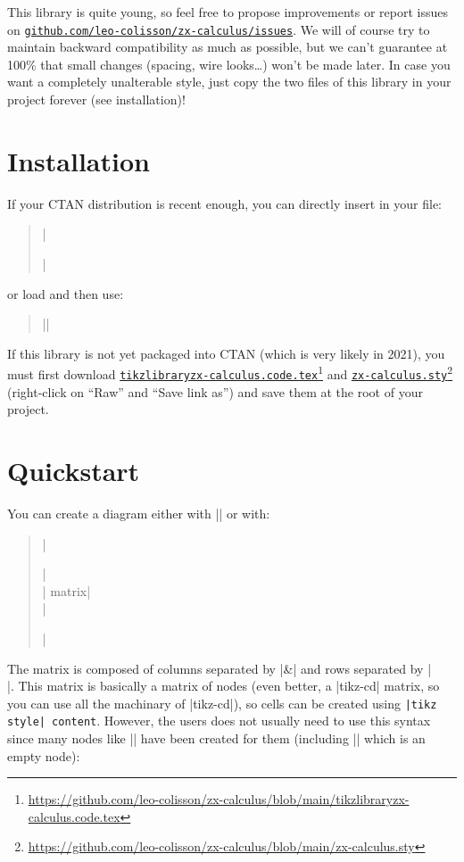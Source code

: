 \documentclass[a4paper]{ltxdoc}
\newcommand{\mylink}[2]{\href{#1}{#2}\footnote{\url{#1}}}
\begin{document}
This library is quite young, so feel free to propose improvements or report issues on \href{https://github.com/leo-colisson/zx-calculus/issues}{\texttt{github.com/leo-colisson/zx-calculus/issues}}. We will of course try to maintain backward compatibility as much as possible, but we can't guarantee at 100\% that small changes (spacing, wire looks\dots{}) won't be made later. In case you want a completely unalterable style, just copy the two files of this library in your project forever (see installation)!

\section{Installation}

If your CTAN distribution is recent enough, you can directly insert in your file:
\begin{verse}
  |\usepackage{zx-calculus}|%
\end{verse}
or load \tikzname{} and then use:
\begin{verse}%
   |\usetikzlibrary{zx-calculus}|%
\end{verse}
If this library is not yet packaged into CTAN (which is very likely in 2021), you must first download \mylink{https://github.com/leo-colisson/zx-calculus/blob/main/tikzlibraryzx-calculus.code.tex}{\texttt{tikzlibraryzx-calculus.code.tex}} and \mylink{https://github.com/leo-colisson/zx-calculus/blob/main/zx-calculus.sty}{\texttt{zx-calculus.sty}} (right-click on ``Raw'' and ``Save link as'') and save them at the root of your project.

\section{Quickstart}

You can create a diagram either with || or with:
\begin{verse}
  |\begin{ZX}[options]|\\
    |  matrix|\\
  |\end{ZX}|
\end{verse}
The matrix is composed of columns separated by |&| and rows separated by |\\|. This matrix is basically a \tikzname{} matrix of nodes (even better, a |tikz-cd| matrix, so you can use all the machinary of |tikz-cd|), so cells can be created using \verb#|tikz style| content#. However, the users does not usually need to use this syntax since many nodes like || have been created for them (including |\zxN{}| which is an empty node):
\end{document}
